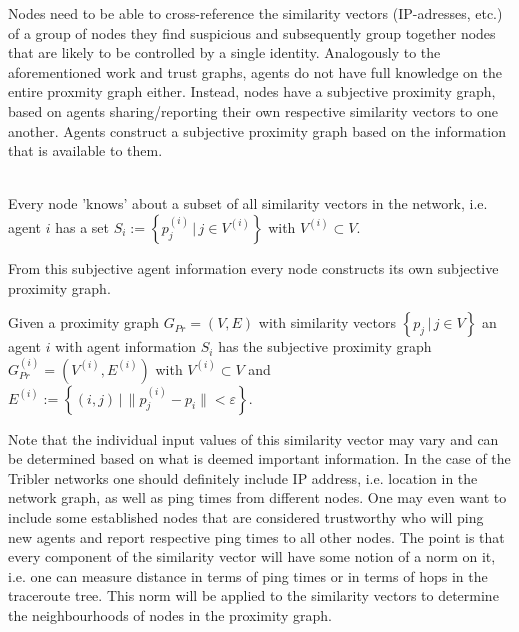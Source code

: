 \noindent{}Nodes need to be able to cross-reference the similarity vectors (IP-adresses, etc.) of a group of nodes they find suspicious and subsequently group together nodes that are likely to be controlled by a single identity. Analogously to the aforementioned work and trust graphs, agents do not have full knowledge on the entire proxmity graph either. Instead, nodes have a subjective proximity graph, based on agents sharing/reporting their own respective similarity vectors to one another. Agents construct a subjective proximity graph based on the information that is available to them. \vspace{1em}\\

\begin{definition}\ \\
Every node 'knows' about a subset of all similarity vectors in the network, i.e. agent $i$ has a set $S_i:=\left\lbrace{}p^{(i)}_j\,|\,j\in{}V^{(i)}\right\rbrace$ with $V^{(i)}\subset{}V$.
\end{definition}
\noindent{}From this subjective agent information every node constructs its own subjective proximity graph.
\begin{definition}
Given a proximity graph $G_{Pr}=(V,E)$ with similarity vectors $\left\lbrace{}p_j\,|\,j\in{}V\right\rbrace$ an agent $i$ with agent information $S_i$ has the subjective proximity graph $G_{Pr}^{(i)}=(V^{(i)},E^{(i)})$ with $V^{(i)}\subset{}V$ and $E^{(i)}:=\left\lbrace{}(i,j)\,|\,\|p^{(i)}_j-p_i\|<\varepsilon\right\rbrace$.
\end{definition}


\noindent{}Note that the individual input values of this similarity vector may vary and can be determined based on what is deemed important information. In the case of the Tribler networks one should definitely include IP address, i.e. location in the network graph, as well as ping times from different nodes. One may even want to include some established nodes that are considered trustworthy who will ping new agents and report respective ping times to all other nodes. The point is that every component of the similarity vector will have some notion of a norm on it, i.e. one can measure distance in terms of ping times or in terms of hops in the traceroute tree. This norm will be applied to the similarity vectors to determine the neighbourhoods of nodes in the proximity graph. \vspace{1em}\\ 

